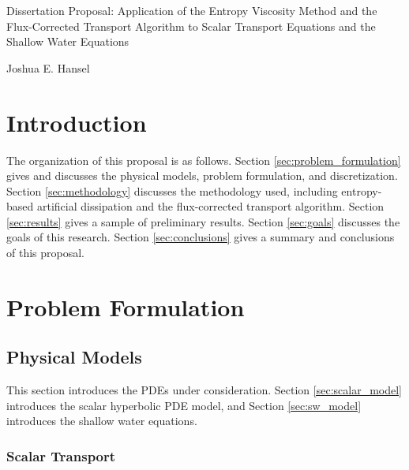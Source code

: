 \documentclass[12pt]{article}
\newcommand{\contentdir}{../dissertation/content}
\begin{document}
\begin{center}
  {\large
    Dissertation Proposal: Application of the Entropy Viscosity Method and the Flux-Corrected Transport
    Algorithm to Scalar Transport Equations and the Shallow Water Equations
  }

  \vspace{1em}

  Joshua E. Hansel
\end{center}

\section{Introduction}


The organization of this proposal is as follows.
Section \ref{sec:problem_formulation} gives and discusses the physical models,
problem formulation, and discretization.
Section \ref{sec:methodology} discusses the methodology used, including
entropy-based artificial dissipation and the flux-corrected transport
algorithm.
Section \ref{sec:results} gives a sample of preliminary results.
Section \ref{sec:goals} discusses the goals of this research.
Section \ref{sec:conclusions} gives a summary and conclusions of this proposal.

\section{Problem Formulation\label{sec:problem_formulation}}
\subsection{Physical Models}
This section introduces the PDEs under consideration. Section
\ref{sec:scalar_model} introduces the scalar hyperbolic PDE model, and
Section \ref{sec:sw_model} introduces the shallow water equations.
\subsubsection{Scalar Transport\label{sec:scalar_model}}

\end{document}
